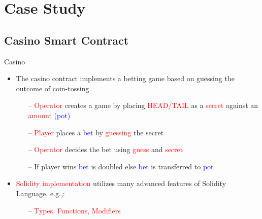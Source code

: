 \documentclass[aspectratio=169]{beamer}
\begin{document}
\section{Case Study}

\subsection{Casino Smart Contract}
%
\begin{frame}{Casino}
\begin{itemize}

\item The casino contract implements a betting game based on guessing  the outcome of coin-tossing.
\begin{itemize}
\item[--] \textcolor{red}{Operator} creates a game by placing \textcolor{red}{HEAD/TAIL} as a \textcolor{red}{ secret} against an \textcolor{red}{ amount} \textcolor{blue}{ (pot)}
\item[--] \textcolor{red}{Player} places a \textcolor{blue}{ bet} by \textcolor{red}{guessing} the secret 
\item[--] \textcolor{red}{Operator} decides the bet using \textcolor{red}{guess} and \textcolor{red}{secret}
\item[--] If player wins \textcolor{blue}{ bet} is doubled else \textcolor{blue}{bet} is transferred to \textcolor{blue}{pot}
\end{itemize}
\item \textcolor{red}{Solidity  implementation} utilizes many advanced features of Solidity Language, e.g.,:
\begin{itemize}
\item[--] \textcolor{red}{Types, Functions, Modifiers }
\end{itemize}
\end{itemize}
\end{frame}
\end{document}
